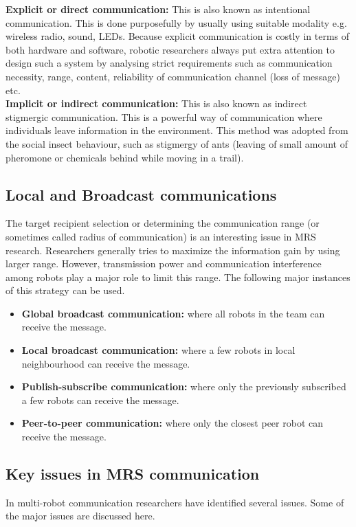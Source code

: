 \textbf{Explicit or direct communication:}
This is also known as intentional communication. This is done purposefully by usually using suitable modality e.g. wireless radio, sound, LEDs. Because explicit communication is costly in terms of both hardware and software, robotic researchers always put extra attention to design such a system by analysing strict requirements such as communication necessity, range, content, reliability of communication channel (loss of message) etc.\\

\textbf{Implicit or indirect communication:} 
This is also known as indirect stigmergic communication. This is a powerful way of communication where individuals leave information in the environment. This method was adopted from the social insect behaviour, such as stigmergy of ants (leaving of small amount of pheromone or chemicals behind while moving in a trail). 
\subsection*{Local and Broadcast communications}
The target recipient selection or determining the communication range (or sometimes called radius of communication) is an interesting issue in MRS research. Researchers generally tries to maximize the information gain by using larger range. However, transmission power and communication interference among robots play a major role to limit this range. The following major instances of this strategy can be used.
\begin{itemize}
\item \textbf{Global broadcast communication:} where all robots in the team can receive the message.
\item \textbf{Local broadcast communication:} where a few robots in local neighbourhood can receive the message.
\item \textbf{Publish-subscribe communication:} where only the previously subscribed a few robots can receive the message.
\item \textbf{Peer-to-peer communication:} where only the closest peer robot can receive the message.
\end{itemize}
\subsection{Key issues in MRS communication}
In multi-robot communication researchers have identified several issues. Some of the major issues are discussed here.

